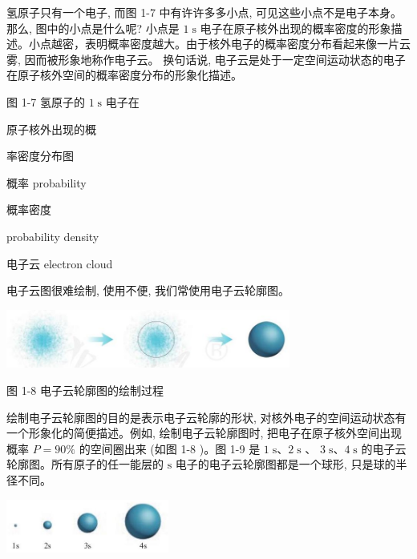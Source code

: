 \documentclass[10pt]{article}
\begin{document}
氢原子只有一个电子, 而图 1-7 中有许许多多小点, 可见这些小点不是电子本身。那么, 图中的小点是什么呢? 小点是 \(1\mathrm{\;s}\) 电子在原子核外出现的概率密度的形象描述。小点越密，表明概率密度越大。由于核外电子的概率密度分布看起来像一片云雾, 因而被形象地称作电子云。 换句话说, 电子云是处于一定空间运动状态的电子在原子核外空间的概率密度分布的形象化描述。

\begin{mdframed}

图 1-7 氢原子的 \(1\mathrm{\;s}\) 电子在

原子核外出现的概

率密度分布图

\end{mdframed}

\begin{mdframed}

概率 probability

概率密度

probability density

电子云 electron cloud

\end{mdframed}

电子云图很难绘制, 使用不便, 我们常使用电子云轮廓图。

\begin{center}
\includegraphics[max width=0.7\textwidth]{images/0190e026-5a11-7df7-bd27-54d09026ba7a_15_553777.jpg}
\end{center}

图 1-8 电子云轮廓图的绘制过程

绘制电子云轮廓图的目的是表示电子云轮廓的形状, 对核外电子的空间运动状态有一个形象化的简便描述。例如, 绘制电子云轮廓图时, 把电子在原子核外空间出现概率 \(P = {90}\%\) 的空间圈出来 (如图 1-8 )。图 1-9 是 \(1\mathrm{\;s}\text{、}2\mathrm{\;s}\) 、 \(3\mathrm{\;s}\text{、}4\mathrm{\;s}\) 的电子云轮廓图。所有原子的任一能层的 \(\mathrm{s}\) 电子的电子云轮廓图都是一个球形, 只是球的半径不同。

\begin{center}
\includegraphics[max width=0.4\textwidth]{images/0190e026-5a11-7df7-bd27-54d09026ba7a_16_785373.jpg}
\end{center}
\end{document}
